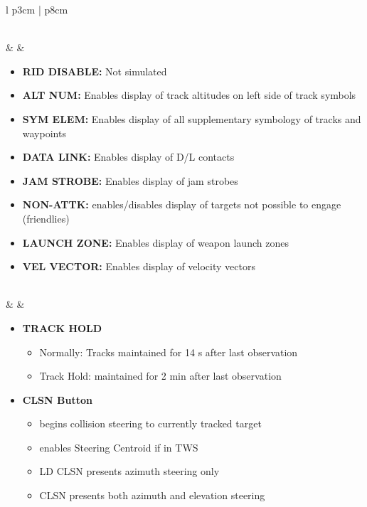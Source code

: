 \documentclass[fontHelvetica, widesubsec]{TechCheck}
\begin{document}
\begin{center}
\begin{longtable}{l p{3cm} | p{8cm}}
\begin{minipage}[t]{\linewidth}
			\end{minipage} \\
			\midrule
			\textbf{\textbullet} &    &
			\begin{minipage}[t]{\linewidth}
				\vspace{-7pt}
				\begin{itemize}
					\item \textbf{RID DISABLE:} Not simulated
					\item \textbf{ALT NUM:} Enables display of track altitudes on left side of track symbols
					\item \textbf{SYM ELEM:} Enables display of all supplementary symbology of tracks and waypoints
					\item \textbf{DATA LINK:} Enables display of D/L contacts
					\item \textbf{JAM STROBE:} Enables display of jam strobes
					\item \textbf{NON-ATTK:} enables/disables display of targets not possible to engage (friendlies)
					\item \textbf{LAUNCH ZONE:} Enables display of weapon launch zones
					\item \textbf{VEL VECTOR:} Enables display of velocity vectors
				\end{itemize}
			\end{minipage} \\
			\midrule
			\textbf{\textbullet} &    &
			\begin{minipage}[t]{\linewidth}
				\vspace{-7pt}
				\begin{itemize}
					\item \textbf{TRACK HOLD}
					\begin{itemize}
						\item Normally: Tracks maintained for 14 s after last observation
						\item Track Hold: maintained for 2 min after last observation
					\end{itemize}
					\item \textbf{CLSN Button}
					\begin{itemize}
						\item begins collision steering to currently tracked target
						\item enables Steering Centroid if in TWS
						\item LD CLSN presents azimuth steering only
						\item CLSN presents both azimuth and elevation steering

\end{itemize}
\end{itemize}
\end{minipage}
\end{longtable}
\end{center}
\end{document}
